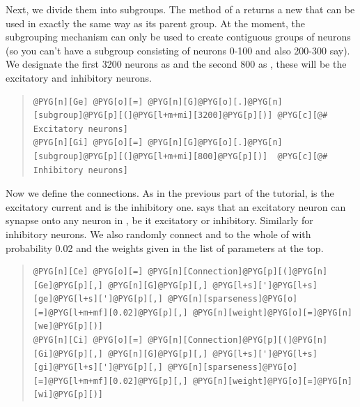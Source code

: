 \documentclass[letterpaper,10pt,english]{manual}
\begin{document}
Next, we divide them into subgroups. The \hyperlink{brian.NeuronGroup.subgroup}{} method of a
\hyperlink{brian.NeuronGroup}{} returns a new \hyperlink{brian.NeuronGroup}{} that can be used in
exactly the same way as its parent group. At the moment, the
subgrouping mechanism can only be used to create contiguous
groups of neurons (so you can't have a subgroup consisting
of neurons 0-100 and also 200-300 say). We designate the
first 3200 neurons as  and the second 800 as , these
will be the excitatory and inhibitory neurons.
\begin{quote}

\begin{Verbatim}[commandchars=@\[\]]
@PYG[n][Ge] @PYG[o][=] @PYG[n][G]@PYG[o][.]@PYG[n][subgroup]@PYG[p][(]@PYG[l+m+mi][3200]@PYG[p][)] @PYG[c][@# Excitatory neurons]
@PYG[n][Gi] @PYG[o][=] @PYG[n][G]@PYG[o][.]@PYG[n][subgroup]@PYG[p][(]@PYG[l+m+mi][800]@PYG[p][)]  @PYG[c][@# Inhibitory neurons]
\end{Verbatim}
\end{quote}

Now we define the connections. As in the previous part of the
tutorial,  is the excitatory current and  is the inhibitory
one.  says that an excitatory neuron can synapse onto any
neuron in , be it excitatory or inhibitory. Similarly for
inhibitory neurons. We also randomly connect  and  to the whole of  with
probability 0.02 and the weights given in the list of
parameters at the top.
\begin{quote}

\begin{Verbatim}[commandchars=@\[\]]
@PYG[n][Ce] @PYG[o][=] @PYG[n][Connection]@PYG[p][(]@PYG[n][Ge]@PYG[p][,] @PYG[n][G]@PYG[p][,] @PYG[l+s][']@PYG[l+s][ge]@PYG[l+s][']@PYG[p][,] @PYG[n][sparseness]@PYG[o][=]@PYG[l+m+mf][0.02]@PYG[p][,] @PYG[n][weight]@PYG[o][=]@PYG[n][we]@PYG[p][)]
@PYG[n][Ci] @PYG[o][=] @PYG[n][Connection]@PYG[p][(]@PYG[n][Gi]@PYG[p][,] @PYG[n][G]@PYG[p][,] @PYG[l+s][']@PYG[l+s][gi]@PYG[l+s][']@PYG[p][,] @PYG[n][sparseness]@PYG[o][=]@PYG[l+m+mf][0.02]@PYG[p][,] @PYG[n][weight]@PYG[o][=]@PYG[n][wi]@PYG[p][)]
\end{Verbatim}
\end{quote}
\end{document}

